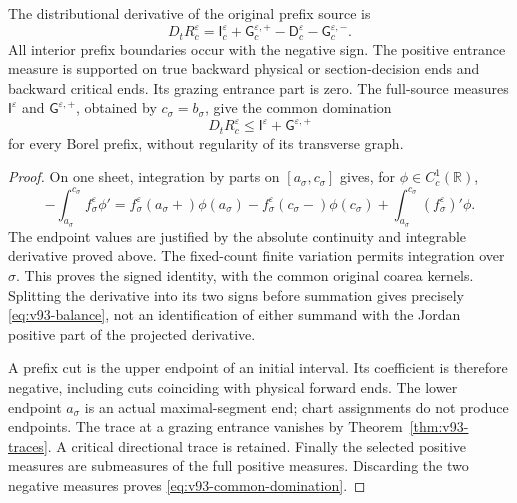 \begin{theorem}
\label{thm:v93-balance}
The distributional derivative of the original prefix source is
\begin{equation}\label{eq:v93-balance}
 D_tR_c^\varepsilon
   =\mathsf I_c^\varepsilon+\mathsf G_c^{\varepsilon,+}
       -\mathsf D_c^\varepsilon-\mathsf G_c^{\varepsilon,-}.
\end{equation}
All interior prefix boundaries occur with the negative sign.
The positive entrance measure is supported on true backward physical
or section-decision ends and backward critical ends. Its grazing
entrance part is zero. The full-source measures
$\mathsf I^\varepsilon$ and $\mathsf G^{\varepsilon,+}$, obtained by
$c_\sigma=b_\sigma$, give the common domination
\begin{equation}\label{eq:v93-common-domination}
          D_tR_c^\varepsilon\le
                   \mathsf I^\varepsilon+\mathsf G^{\varepsilon,+}
\end{equation}
for every Borel prefix, without regularity of its transverse graph.
\end{theorem}
\begin{proof}
On one sheet, integration by parts on $[a_\sigma,c_\sigma]$ gives,
for $\phi\in C_c^1(\mathbb R)$,
\[
 -\int_{a_\sigma}^{c_\sigma}f_\sigma^\varepsilon\phi'
  =f_\sigma^\varepsilon(a_\sigma+)\phi(a_\sigma)
    -f_\sigma^\varepsilon(c_\sigma-)\phi(c_\sigma)
    +\int_{a_\sigma}^{c_\sigma}(f_\sigma^\varepsilon)'\phi.
\]
The endpoint values are justified by the absolute continuity and
integrable derivative proved above. The fixed-count finite variation
permits integration over $\sigma$. This proves the signed identity,
with the common original coarea kernels. Splitting the derivative
into its two signs before summation gives precisely
\eqref{eq:v93-balance}, not an identification of either summand with
the Jordan positive part of the projected derivative.

A prefix cut is the upper endpoint of an initial interval. Its
coefficient is therefore negative, including cuts coinciding with
physical forward ends. The lower endpoint $a_\sigma$ is an actual
maximal-segment end; chart assignments do not produce endpoints.
The trace at a grazing entrance vanishes by
Theorem~\ref{thm:v93-traces}. A critical directional trace is retained.
Finally the selected positive measures are submeasures of the full
positive measures. Discarding the two negative measures proves
\eqref{eq:v93-common-domination}.
\end{proof}

